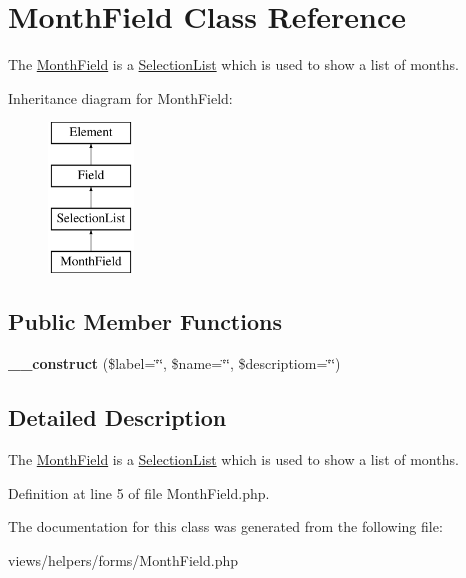 \hypertarget{class_month_field}{
\section{MonthField Class Reference}
\label{class_month_field}
}


The \hyperlink{class_month_field}{MonthField} is a \hyperlink{class_selection_list}{SelectionList} which is used to show a list of months.  


Inheritance diagram for MonthField:\begin{figure}[H]
\begin{center}
\leavevmode
\includegraphics[height=4.000000cm]{class_month_field}
\end{center}
\end{figure}
\subsection*{Public Member Functions}
\begin{DoxyCompactItemize}
\item 
\hypertarget{class_month_field_a047f3284b47ce4f4c76988ec7da9b1ee}{
{\bfseries \_\-\_\-construct} (\$label=\char`\"{}\char`\"{}, \$name=\char`\"{}\char`\"{}, \$descriptiom=\char`\"{}\char`\"{})}
\label{class_month_field_a047f3284b47ce4f4c76988ec7da9b1ee}

\end{DoxyCompactItemize}


\subsection{Detailed Description}
The \hyperlink{class_month_field}{MonthField} is a \hyperlink{class_selection_list}{SelectionList} which is used to show a list of months. 

Definition at line 5 of file MonthField.php.



The documentation for this class was generated from the following file:\begin{DoxyCompactItemize}
\item 
views/helpers/forms/MonthField.php\end{DoxyCompactItemize}
